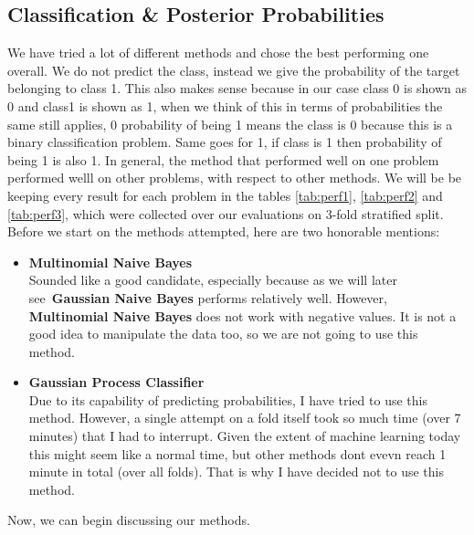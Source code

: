 \documentclass[11pt,reqno]{amsart}
\begin{document}
\subsection{Classification \& Posterior Probabilities}
We have tried a lot of different methods and chose the best performing one overall. We do not predict the class, instead we give the probability of the target belonging to class 1. This also makes sense because in our case class 0 is shown as 0 and class1 is shown as 1, when we think of this in terms of probabilities the same still applies, 0 probability of being 1 means the class is 0 because this is a binary classification problem. Same goes for 1, if class is 1 then probability of being 1 is also 1. In general, the method that performed well on one problem performed welll on other problems, with respect to other methods. We will be be keeping every result for each problem in the tables \ref{tab:perf1}, \ref{tab:perf2} and \ref{tab:perf3}, which were collected over our evaluations on 3-fold stratified split. Before we start on the methods attempted, here are two honorable mentions:
\begin{itemize}
	\item \textbf{Multinomial Naive Bayes} \\
	Sounded like a good candidate, especially because as we will later see\ \textbf{Gaussian Naive Bayes} performs relatively well. However, \textbf{Multinomial Naive Bayes} does not work with negative values. It is not a good idea to manipulate the data too, so we are not going to use this method.
	\item \textbf{Gaussian Process Classifier} \\
	Due to its capability of predicting probabilities, I have tried to use this method. However, a single attempt on a fold itself took so much time (over 7 minutes) that I had to interrupt. Given the extent of machine learning today this might seem like a normal time, but other methods dont evevn reach 1 minute in total (over all folds). That is why I have decided not to use this method.
\end{itemize}
Now, we can begin discussing our methods. 
\end{document}
